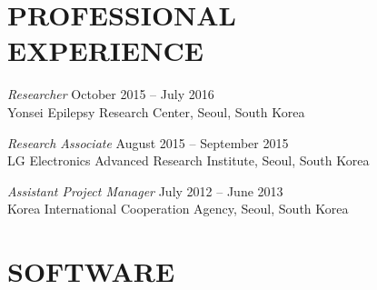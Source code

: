 \documentclass[margin, 10pt]{res} %
\begin{document}
\begin{resume}

\section{\sf PROFESSIONAL \\ EXPERIENCE} 

{\sl Researcher} \hfill October 2015 -- July 2016 \\
Yonsei Epilepsy Research Center, Seoul, South Korea

{\sl Research Associate} \hfill August 2015 -- September 2015 \\
LG Electronics Advanced Research Institute, Seoul, South Korea

{\sl Assistant Project Manager} \hfill July 2012 -- June 2013 \\
Korea International Cooperation Agency, Seoul, South Korea

\vspace{.2cm}



\section{\sf SOFTWARE} 


\end{resume}
\end{document}

